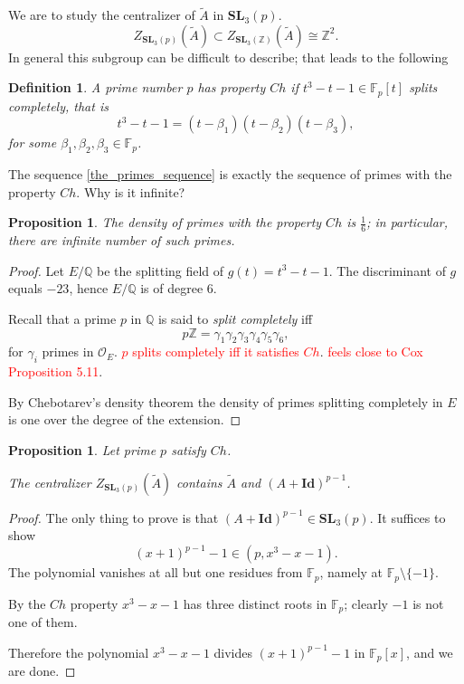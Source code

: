 \documentclass[a4paper]{article}
\newcommand{\red}{\textcolor{red}} %
\newtheorem{Def}[Thm]{Definition}
\newtheorem{Prop}[Thm]{Proposition}
\newcommand{\Q}{\mathbb{Q}}        %
\renewcommand{\O}{\mathcal{O}}        %
\newcommand{\Id}{\mathbf{Id}}        %
\newcommand{\SL}{\mathbf{SL}_3(\mathbb{Z})}        %
\newcommand{\SLp}{\mathbf{SL}_3(p)}        %
\begin{document}
We are to study the centralizer of $\tilde A$ in $\SLp$.
\[
Z_{\SLp}(\tilde A) \subset 
Z_{\SL}(\tilde A) \cong \mathbb{Z}^2
.\] 
In general this subgroup can be difficult to describe; 
that leads to the following
\begin{Def}
	A prime number $p$ has property $Ch$ if $t^3 - t - 1 \in \mathbb F_p[t]$ splits completely, that is  
\[
t^3 - t - 1 = (t - \beta_1)(t - \beta_2)(t - \beta_3)
,\] 
for some $\beta_1, \beta_2, \beta_3 \in \mathbb F_p$.
\end{Def}
The sequence \eqref{the_primes_sequence} is exactly the sequence of primes with the property $Ch$.
Why is it infinite?
\begin{Prop}
The density of primes with the property $Ch$ is $\frac{1}{6}$; in particular, there are infinite number of such primes.
\end{Prop}
\begin{proof}
Let $E/ \Q$ be the splitting field of $g(t) = t^3 - t - 1$.
The discriminant of $g$ equals $-23$, hence $E / \Q$ is of degree $6$.

Recall that a prime $p$ in $\Q$ is said to \emph{split completely} iff 
\[
p \mathbb{Z} = \gamma_1 \gamma_2 \gamma_3 \gamma_4 \gamma_5 \gamma_6
,\] 
for $\gamma_i$ primes in $\O_E$.
\red{$p$ splits completely iff it satisfies $Ch$}.
\red{feels close to Cox \cite{cox2022primes} Proposition 5.11}.

By Chebotarev's density theorem the density of primes splitting completely in $E$ is one over the degree of the extension.
\end{proof}

\begin{Prop}
Let prime $p$ satisfy $Ch$.

The centralizer $Z_{\SLp}(\tilde A)$ contains $\tilde A$ and $(A + \Id)^{p - 1}$.
\end{Prop}
\begin{proof}
The only thing to prove is that 
$(A + \Id)^{p - 1} \in \SLp$.
It suffices to show 
\[
	(x + 1)^{p - 1} - 1 \in (p, x^3 - x - 1)
.\] 
The polynomial vanishes at all but one residues from $\mathbb F_p$, namely at $\mathbb F_p \setminus \{ -1 \} $.

By the $Ch$ property $x^3 - x - 1$ has three distinct roots in $\mathbb F_p$; clearly $-1$ is not one of them.

Therefore the polynomial $ x^3 - x - 1 $ divides $ (x + 1)^{p - 1} - 1 $ in $\mathbb F_p[x]$, and we are done.
\end{proof}
\end{document}
